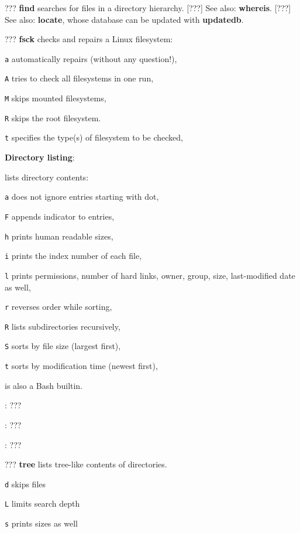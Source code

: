 \begin{compactenum}
	\item [???] \textbf{find} searches for files in a directory hierarchy.
	[???] See also: \textbf{whereis}.
	[???] See also: \textbf{locate}, whose database can be updated with \textbf{updatedb}.
\end{compactenum}

\begin{compactenum}
	\item [???] \textbf{fsck} checks and repairs a Linux filesystem:
	\item [\texttt{a}] automatically repairs (without any question!),
	\item [\texttt{A}] tries to check all filesystems in one run,
	\item [\texttt{M}] skips mounted filesystems,
	\item [\texttt{R}] skips the root filesystem.
	\item [\texttt{t}] specifies the type(s) of filesystem to be checked,
\end{compactenum}

\textbf{Directory listing}:
\begin{compactenum}
	\item [\symbolcoreutils]  lists directory contents:
	\item [\texttt{a}] does not ignore entries starting with dot, 
	\item [\texttt{F}] appends indicator to entries, 
	\item [\texttt{h}] prints human readable sizes, 
	\item [\texttt{i}] prints the index number of each file, 
	\item [\texttt{l}] prints permissions, number of hard links, owner, group, size, last-modified date as well, 
	\item [\texttt{r}] reverses order while sorting,
	\item [\texttt{R}] lists subdirectories recursively, 
	\item [\texttt{S}] sorts by file size (largest first), 
	\item [\texttt{t}] sorts by modification time (newest first), 

	\item [\symbolcoreutils]  is also a Bash builtin.

	\item [\symbolcoreutils] : \dotfill ???

	\item [\symbolcoreutils] : \dotfill ???

	\item [\symbolcoreutils] : \dotfill ???

	\item [???] \textbf{tree} lists tree-like contents of directories.
	\item [\texttt{d}] skips files
	\item [\texttt{L}] limits search depth
	\item [\texttt{s}] prints sizes as well
\end{compactenum}

